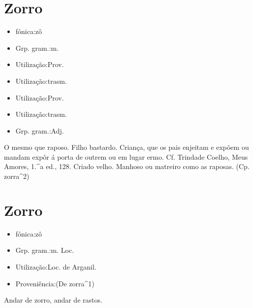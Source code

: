 \section{Zorro}
\begin{itemize}
\item {fónica:zô}
\end{itemize}
\begin{itemize}
\item {Grp. gram.:m.}
\end{itemize}
\begin{itemize}
\item {Utilização:Prov.}
\end{itemize}
\begin{itemize}
\item {Utilização:trasm.}
\end{itemize}
\begin{itemize}
\item {Utilização:Prov.}
\end{itemize}
\begin{itemize}
\item {Utilização:trasm.}
\end{itemize}
\begin{itemize}
\item {Grp. gram.:Adj.}
\end{itemize}
O mesmo que \textunderscore raposo\textunderscore .
Filho bastardo.
Criança, que os pais enjeitam e expõem ou mandam expôr á porta de outrem ou em lugar ermo. Cf. Trindade Coelho, \textunderscore Meus Amores\textunderscore , 1.^a ed., 128.
Criado velho.
Manhoso ou matreiro como as raposas.
(Cp. \textunderscore zorra\textunderscore ^2)
\section{Zorro}
\begin{itemize}
\item {fónica:zô}
\end{itemize}
\begin{itemize}
\item {Grp. gram.:m.  Loc.}
\end{itemize}
\begin{itemize}
\item {Utilização:Loc. de Arganil.}
\end{itemize}
\begin{itemize}
\item {Proveniência:(De \textunderscore zorra\textunderscore ^1)}
\end{itemize}
\textunderscore Andar de zorro\textunderscore , andar de rastos.
